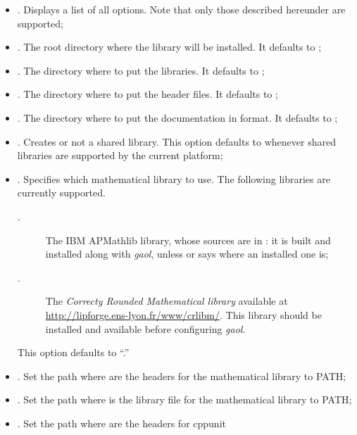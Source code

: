 \documentclass{manual}
\begin{document}
\begin{itemize}
\item {}. Displays a list of all options. Note that only
those described hereunder are supported;
%
\item {}. The root directory where the library
will be installed. It defaults to ;
\item {}. The directory where to put the
libraries. It defaults to ;
\item {}. The directory where to
put the header files. It defaults to ;
\item {}. The directory where to put the
documentation in  format. It defaults to ;
\item {}. Creates or not a shared
library. This option defaults to  whenever shared libraries
are supported by the current platform;
\item {}. Specifies which mathematical library to use.
  The following libraries are currently supported.
\begin{description}
 \item[.] The IBM APMathlib library, whose sources are in : it is built and installed along with \emph{gaol},
   unless  or  says where an installed one is;
 \item[.] The \emph{Correcty Rounded Mathematical library} available at \url{http://lipforge.ens-lyon.fr/www/crlibm/}.
	This library should be installed and available before configuring \emph{gaol}.
\end{description}
  This option defaults to ``.''
\item {}. Set the path where are the headers for the mathematical
  library to PATH;
\item {}. Set the path where is the library file for the mathematical
  library to PATH;
\item {}. Set the path where are the headers for cppunit

\end{itemize}
\end{document}
